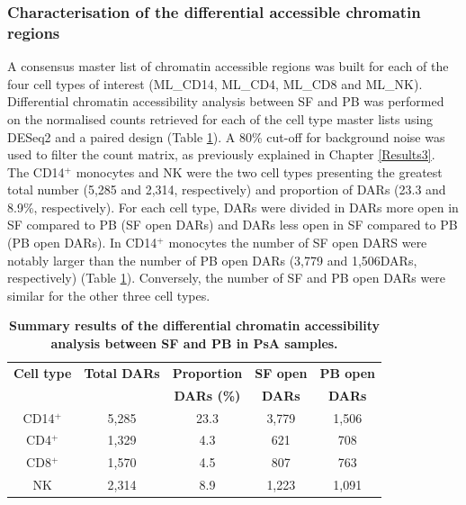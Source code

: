 \subsubsection{Characterisation of the differential accessible chromatin regions}
A consensus master list of chromatin accessible regions was built for each of the four cell types of interest (ML\_CD14, ML\_CD4, ML\_CD8 and ML\_NK). Differential chromatin accessibility analysis between SF and PB was performed on the normalised counts retrieved for each of the cell type master lists using DESeq2 and a paired design (Table \ref{tab:PSA_DOCs_results}). A 80\% cut-off for background noise was used to filter the count matrix, as previously explained in Chapter \ref{Results3}. %
The CD14$^+$ monocytes and NK were the two cell types presenting the greatest total number (5,285 and 2,314, respectively) and proportion of DARs (23.3 and 8.9\%, respectively). For each cell type, DARs were divided in DARs more open in SF compared to PB (SF open DARs) and DARs less open in SF compared to PB (PB open DARs). In CD14$^+$ monocytes the number of SF open DARS were notably larger than the number of PB open DARs (3,779 and 1,506DARs, respectively) (Table \ref{tab:PSA_DOCs_results}). Conversely, the number of SF and PB open DARs were similar for the other three cell types.


\begin{table}[htbp]
\centering
\begin{tabular}{@{}c c c c c}
\toprule
\textbf{Cell type}  & \textbf{Total DARs} &  \textbf{Proportion}  & \textbf{SF open} & \textbf{PB open} \\
                    &                     &  \textbf{DARs (\%)}  & \textbf{DARs} & \textbf{DARs} \\
\midrule
\midrule
CD14$^+$ & 5,285 & 23.3 & 3,779 & 1,506 \\
CD4$^+$  & 1,329 & 4.3 & 621 & 708 \\
CD8$^+$  & 1,570 & 4.5 & 807 & 763 \\
NK       & 2,314 & 8.9 & 1,223 & 1,091 \\
\bottomrule
\end{tabular}
\medskip %
\caption[Summary results of the differential chromatin accessibility analysis between SF and PB in PsA samples.]{\textbf{Summary results of the differential chromatin accessibility analysis between SF and PB in PsA samples.}}
\label{tab:PSA_DOCs_results}
\end{table}

